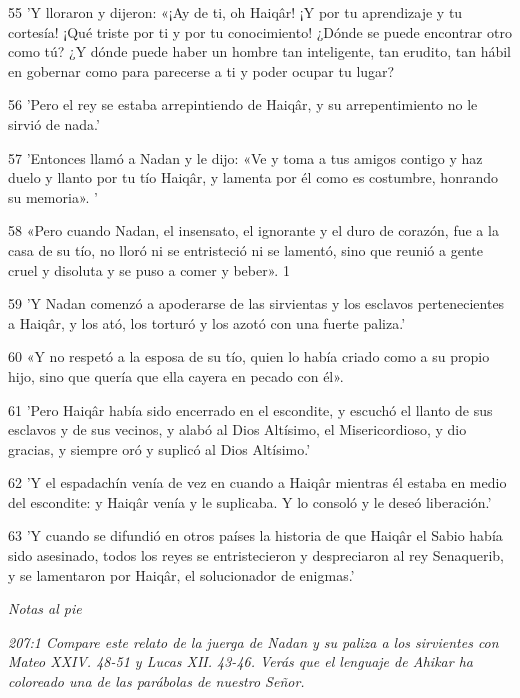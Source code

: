 \par 55 'Y lloraron y dijeron: «¡Ay de ti, oh Haiqâr! ¡Y por tu aprendizaje y tu cortesía! ¡Qué triste por ti y por tu conocimiento! ¿Dónde se puede encontrar otro como tú? ¿Y dónde puede haber un hombre tan inteligente, tan erudito, tan hábil en gobernar como para parecerse a ti y poder ocupar tu lugar?

\par 56 'Pero el rey se estaba arrepintiendo de Haiqâr, y su arrepentimiento no le sirvió de nada.'

\par 57 'Entonces llamó a Nadan y le dijo: «Ve y toma a tus amigos contigo y haz duelo y llanto por tu tío Haiqâr, y lamenta por él como es costumbre, honrando su memoria». '

\par 58 «Pero cuando Nadan, el insensato, el ignorante y el duro de corazón, fue a la casa de su tío, no lloró ni se entristeció ni se lamentó, sino que reunió a gente cruel y disoluta y se puso a comer y beber». 1

\par 59 'Y Nadan comenzó a apoderarse de las sirvientas y los esclavos pertenecientes a Haiqâr, y los ató, los torturó y los azotó con una fuerte paliza.'

\par 60 «Y no respetó a la esposa de su tío, quien lo había criado como a su propio hijo, sino que quería que ella cayera en pecado con él».

\par 61 'Pero Haiqâr había sido encerrado en el escondite, y escuchó el llanto de sus esclavos y de sus vecinos, y alabó al Dios Altísimo, el Misericordioso, y dio gracias, y siempre oró y suplicó al Dios Altísimo.'

\par 62 'Y el espadachín venía de vez en cuando a Haiqâr mientras él estaba en medio del escondite: y Haiqâr venía y le suplicaba. Y lo consoló y le deseó liberación.'

\par 63 'Y cuando se difundió en otros países la historia de que Haiqâr el Sabio había sido asesinado, todos los reyes se entristecieron y despreciaron al rey Senaquerib, y se lamentaron por Haiqâr, el solucionador de enigmas.'

\par \textit{Notas al pie}

\par \textit{207:1 Compare este relato de la juerga de Nadan y su paliza a los sirvientes con Mateo XXIV. 48-51 y Lucas XII. 43-46. Verás que el lenguaje de Ahikar ha coloreado una de las parábolas de nuestro Señor.}


